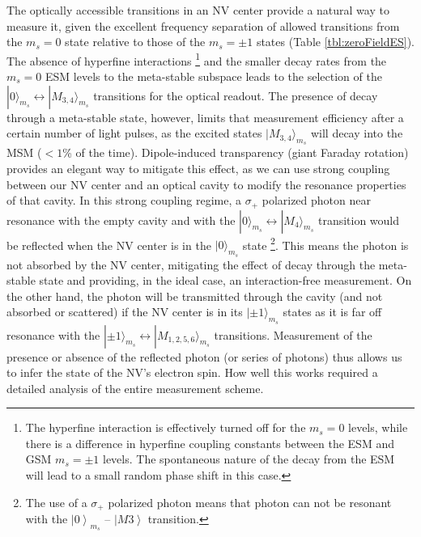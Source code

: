 \documentclass[aps,pra,amsmath,amssymb,reprint,superscriptaddress,tightenlines]{revtex4-1}
\begin{document}
The optically accessible transitions in an NV center provide a natural way to measure it, given the excellent frequency separation of allowed transitions from the $m_s=0$ state relative to those of the $m_s=\pm 1$ states (Table \ref{tbl:zeroFieldES}).  The absence of hyperfine interactions \footnote{The hyperfine interaction is effectively turned off for the $m_s=0$ levels, while there is a difference in hyperfine coupling constants between the ESM and GSM $m_s=\pm 1$ levels. The spontaneous nature of the decay from the ESM will lead to a small random phase shift in this case.} and the smaller decay rates from the $m_s=0$ ESM levels to the meta-stable subspace leads to the selection of the $|0\rangle_{m_s} \leftrightarrow |M_{3,4}\rangle_{m_s}$ transitions for the optical readout. The presence of decay through a meta-stable state, however, limits that measurement efficiency after a certain number of light pulses, as the excited states $|M_{3,4}\rangle_{m_s}$ will decay into the MSM ($<1$\% of the time). Dipole-induced transparency (giant Faraday rotation) \cite{Nemoto14,Hu08,Young09,Koshino12,Sun16} provides an elegant way to mitigate this effect, as we can use strong coupling between our NV center and an optical cavity to modify the resonance properties of that cavity. In this strong coupling regime, a $\sigma_+$ polarized photon near resonance with the empty cavity and with the $|0\rangle_{m_s} \leftrightarrow |M_{4}\rangle_{m_s}$ transition would be reflected when the NV center is in the $|0\rangle_{m_s}$ state \footnote{The use of a $\sigma_+$ polarized photon means that photon can not be resonant with the $\left|0\right>_{m_{s}}$ -- $\left|M3\right>$ transition.}. 
This means the photon is not absorbed by the NV center, mitigating the effect of decay through the meta-stable state and providing, in the ideal case, an interaction-free measurement. On the other hand, the photon will be transmitted through the cavity (and not absorbed or scattered) if the NV center is in its $|\pm 1 \rangle_{m_s}$ states as it is far off resonance with the  $|\pm 1\rangle_{m_s} \leftrightarrow |M_{1,2,5,6}\rangle_{m_s}$ transitions. Measurement of the presence or absence of the reflected photon (or series of photons) thus allows us to infer the state of the NV's electron spin.  How well this works required a detailed analysis of  the entire measurement scheme.
\end{document}
